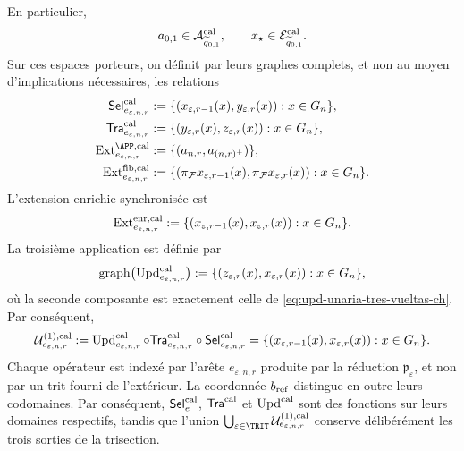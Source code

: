 En particulier,
\[
 a_{0,1}\in\mathcal A^{\rm cal}_{\widetilde q_{0,1}},
 \qquad
 x_\star\in\mathcal E^{\rm cal}_{\widetilde q_{0,1}}.
\]
Sur ces espaces porteurs, on définit par leurs graphes complets, et non au moyen d'implications nécessaires, les relations
\begin{align}
 \mathsf{Sel}^{\rm cal}_{e_{\varepsilon,n,r}}
   &:=\{(x_{\varepsilon,r-1}(x),y_{\varepsilon,r}(x)):
          x\in G_n\},\\
 \mathsf{Tra}^{\rm cal}_{e_{\varepsilon,n,r}}
   &:=\{(y_{\varepsilon,r}(x),z_{\varepsilon,r}(x)):
          x\in G_n\},\\
 \operatorname{Ext}^{\APP,\rm cal}_{e_{\varepsilon,n,r}}
   &:=\{(a_{n,r},a_{(n,r)^+})\},
 \label{eq:ext-app-calibrada-ch}\\
 \operatorname{Ext}^{\rm fib,cal}_{e_{\varepsilon,n,r}}
   &:=\{(\pi_{\mathcal F}x_{\varepsilon,r-1}(x),
          \pi_{\mathcal F}x_{\varepsilon,r}(x)):x\in G_n\}.
 \label{eq:ext-fibra-calibrada-ch}
\end{align}
L'extension enrichie synchronisée est
\begin{equation}
 \operatorname{Ext}^{\rm enr,cal}_{e_{\varepsilon,n,r}}
 :=\{(x_{\varepsilon,r-1}(x),x_{\varepsilon,r}(x)):
       x\in G_n\}.
 \label{eq:ext-enriquecida-calibrada-ch}
\end{equation}
La troisième application est définie par
\begin{equation}
 \operatorname{graph}
 \bigl(\operatorname{Upd}^{\rm cal}_{e_{\varepsilon,n,r}}\bigr)
 :=\{(z_{\varepsilon,r}(x),x_{\varepsilon,r}(x)):
       x\in G_n\},
 \label{eq:grafo-upd-calibrado-ch}
\end{equation}
où la seconde composante est exactement celle de
\eqref{eq:upd-unaria-tres-vueltas-ch}. Par conséquent,
\begin{equation}
 \mathcal U^{(1),\rm cal}_{e_{\varepsilon,n,r}}
 :=\operatorname{Upd}^{\rm cal}_{e_{\varepsilon,n,r}}\circ
   \mathsf{Tra}^{\rm cal}_{e_{\varepsilon,n,r}}\circ
   \mathsf{Sel}^{\rm cal}_{e_{\varepsilon,n,r}}
 =\{(x_{\varepsilon,r-1}(x),x_{\varepsilon,r}(x)):
      x\in G_n\}.
 \label{eq:transicion-cal-en-tpk-ch}
\end{equation}
Chaque opérateur est indexé par l’arête
\(e_{\varepsilon,n,r}\) produite par la réduction
\(\mathfrak p_\varepsilon\), et non par un trit fourni de l’extérieur. La
coordonnée \(b_{\rm ref}\) distingue en outre leurs codomaines. Par conséquent,
\(\mathsf{Sel}^{\rm cal}_{e}\),
\(\mathsf{Tra}^{\rm cal}\) et \(\operatorname{Upd}^{\rm cal}\) sont des fonctions
sur leurs domaines respectifs, tandis que
l’union
\(\bigcup_{\varepsilon\in\TRIT}
\mathcal U^{(1),\rm cal}_{e_{\varepsilon,n,r}}\) conserve délibérément
les trois sorties de la trisection.

